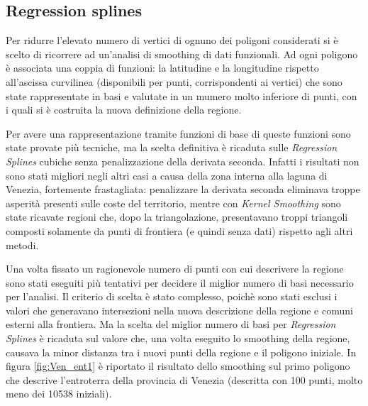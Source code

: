 \documentclass[a4paper,11pt,twoside,openright]{book}							%
\begin{document}
\subsection{Regression splines}

Per ridurre l'elevato numero di vertici di ognuno dei poligoni considerati si è scelto di ricorrere ad un'analisi di smoothing di dati funzionali. Ad ogni poligono è associata una coppia di funzioni: la latitudine e la longitudine rispetto all'ascissa curvilinea (disponibili per punti, corrispondenti ai vertici) che sono state rappresentate in basi e valutate in un mumero molto inferiore di punti, con i quali si è costruita la nuova definizione della regione.

Per avere una rappresentazione tramite funzioni di base di queste funzioni sono state provate più tecniche, ma la scelta definitiva è ricaduta sulle \textit{Regression Splines} cubiche senza penalizzazione della derivata seconda. Infatti i risultati non sono stati migliori negli altri casi a causa della zona interna alla laguna di Venezia, fortemente frastagliata: penalizzare la derivata seconda eliminava troppe asperità presenti sulle coste del territorio, mentre con \textit{Kernel Smoothing} sono state ricavate regioni che, dopo la triangolazione, presentavano troppi triangoli composti solamente da punti di frontiera (e quindi senza dati) rispetto agli altri metodi.

Una volta fissato un ragionevole numero di punti con cui descrivere la regione sono stati eseguiti più tentativi per decidere il miglior numero di basi necessario per l'analisi. Il criterio di scelta è stato complesso, poichè sono stati esclusi i valori che generavano intersezioni nella nuova descrizione della regione e comuni esterni alla frontiera. Ma la scelta del miglior numero di basi per \textit{Regression Splines} è ricaduta sul valore che, una volta eseguito lo smoothing della regione, causava la minor distanza tra i nuovi punti della regione e il poligono iniziale. In figura \ref{fig:Ven_ent1} è riportato il risultato dello smoothing sul primo poligono che descrive l'entroterra della provincia di Venezia (descritta con 100 punti, molto meno dei 10538 iniziali).  
\end{document}
